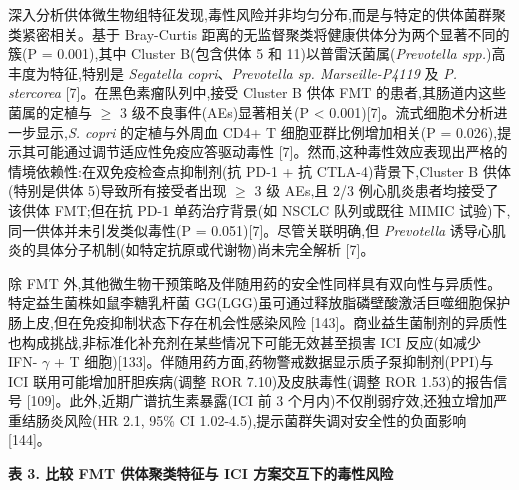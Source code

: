 \documentclass[11pt]{article}
\begin{document}
深入分析供体微生物组特征发现,毒性风险并非均匀分布,而是与特定的供体菌群聚类紧密相关。基于 Bray-Curtis 距离的无监督聚类将健康供体分为两个显著不同的簇(P = 0.001),其中 Cluster B(包含供体 5 和 11)以普雷沃菌属(\emph{Prevotella spp.})高丰度为特征,特别是 \emph{Segatella copri}、\emph{Prevotella sp. Marseille-P4119} 及 \emph{P. stercorea} {[}7{]}。在黑色素瘤队列中,接受 Cluster B 供体 FMT 的患者,其肠道内这些菌属的定植与 \(\geq\) 3 级不良事件(AEs)显著相关(P \textless{} 0.001){[}7{]}。流式细胞术分析进一步显示,\emph{S. copri} 的定植与外周血 CD4+ T 细胞亚群比例增加相关(P = 0.026),提示其可能通过调节适应性免疫应答驱动毒性 {[}7{]}。然而,这种毒性效应表现出严格的情境依赖性:在双免疫检查点抑制剂(抗 PD-1 + 抗 CTLA-4)背景下,Cluster B 供体(特别是供体 5)导致所有接受者出现 \(\geq\) 3 级 AEs,且 2/3 例心肌炎患者均接受了该供体 FMT;但在抗 PD-1 单药治疗背景(如 NSCLC 队列或既往 MIMIC 试验)下,同一供体并未引发类似毒性(P = 0.051){[}7{]}。尽管关联明确,但 \emph{Prevotella} 诱导心肌炎的具体分子机制(如特定抗原或代谢物)尚未完全解析 {[}7{]}。

除 FMT 外,其他微生物干预策略及伴随用药的安全性同样具有双向性与异质性。特定益生菌株如鼠李糖乳杆菌 GG(LGG)虽可通过释放脂磷壁酸激活巨噬细胞保护肠上皮,但在免疫抑制状态下存在机会性感染风险 {[}143{]}。商业益生菌制剂的异质性也构成挑战,非标准化补充剂在某些情况下可能无效甚至损害 ICI 反应(如减少 IFN- \(\gamma\) + T 细胞){[}133{]}。伴随用药方面,药物警戒数据显示质子泵抑制剂(PPI)与 ICI 联用可能增加肝胆疾病(调整 ROR 7.10)及皮肤毒性(调整 ROR 1.53)的报告信号 {[}109{]}。此外,近期广谱抗生素暴露(ICI 前 3 个月内)不仅削弱疗效,还独立增加严重结肠炎风险(HR 2.1, 95\% CI 1.02-4.5),提示菌群失调对安全性的负面影响 {[}144{]}。

\textbf{表 3. 比较 FMT 供体聚类特征与 ICI 方案交互下的毒性风险}
\end{document}
